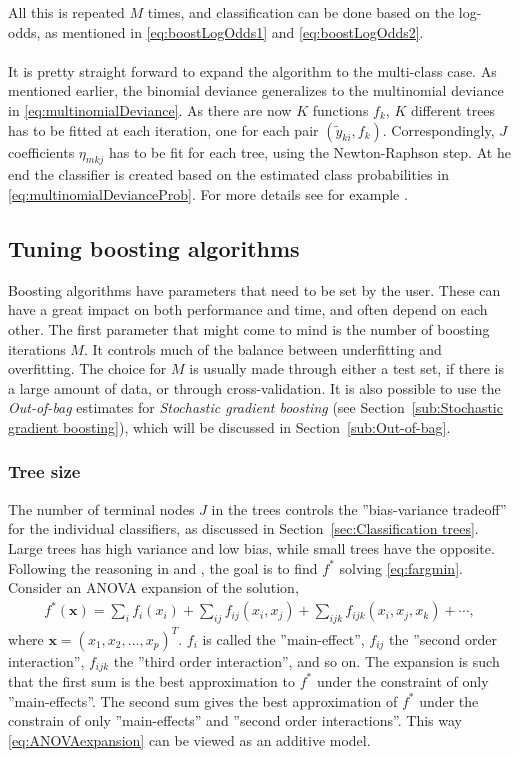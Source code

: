 All this is repeated $M$ times, and classification can be done based on the log-odds, as mentioned in \eqref{eq:boostLogOdds1} and \eqref{eq:boostLogOdds2}. \\
\\
It is pretty straight forward to expand the algorithm to the multi-class case. As mentioned earlier, the binomial deviance generalizes to the multinomial deviance in \eqref{eq:multinomialDeviance}. As there are now $K$ functions $f_k$, $K$ different trees has to be fitted at each iteration, one for each pair $(\tilde y_{k i}, f_k)$. Correspondingly, $J$ coefficients $\eta_{m k j}$ has to be fit for each tree, using the Newton-Raphson step. At he end the classifier is created based on the estimated class probabilities in \eqref{eq:multinomialDevianceProb}. For more details see for example \cite{friedman}.

\subsection{Tuning boosting algorithms}
\label{sub:Tuning boosting algorithms}
Boosting algorithms have parameters that need to be set by the user. These can have a great impact on both performance and time, and often depend on each other. The first parameter that might come to mind is the number of boosting iterations $M$. It controls much of the balance between underfitting and overfitting. The choice for $M$ is usually made through either a test set, if there is a large amount of data, or through cross-validation. It is also possible to use the \textit{Out-of-bag} estimates for  \textit{Stochastic gradient boosting} (see Section~\ref{sub:Stochastic gradient boosting}), which will be discussed in Section~\ref{sub:Out-of-bag}.

\subsubsection{Tree size}
\label{sub:Tree size}
The number of terminal nodes $J$ in the trees controls the ''bias-variance tradeoff'' for the individual classifiers, as discussed in Section~\ref{sec:Classification trees}.  Large trees has high variance and low bias, while small trees have the opposite.   Following the reasoning in \cite{modstat} and \cite{friedman}, the goal is to find $f^*$ solving \eqref{eq:fargmin}. Consider an ANOVA expansion of the solution,
\begin{align}
  \label{eq:ANOVAexpansion} 
  f^*(\mathbf{x}) = \sum_{i} f_i(x_i) + \sum_{ij} f_{ij}(x_i, x_j) + 
  \sum_{ijk} f_{ijk}(x_i, x_j, x_k) + \cdots,
\end{align}
where $\mathbf{x} = (x_1, x_2, \ldots, x_p)^T$. $f_i$ is called the ''main-effect'', $f_{ij}$ the ''second order interaction'', $f_{ijk}$ the ''third order interaction'', and so on. The expansion is such that the first sum is the best approximation to $f^*$ under the constraint of only ''main-effects''. The second sum gives the best approximation of $f^*$ under the constrain of only ''main-effects'' and ''second order interactions''. This way \eqref{eq:ANOVAexpansion} can be viewed as an additive model. 

